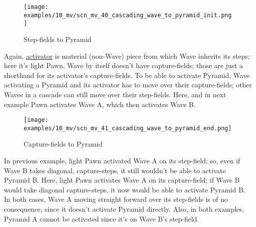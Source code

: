 \vspace*{-0.9\baselineskip}
\noindent
\begin{wrapfigure}[16]{l}{0.4\textwidth}
\centering
\texttt{[image: examples/10\_mv/scn\_mv\_40\_cascading\_wave\_to\_pyramid\_init.png]}
\vspace*{-1.4\baselineskip}
\caption{Step-fields to Pyramid}
\label{fig:scn_mv_40_cascading_wave_to_pyramid_init}
\end{wrapfigure}
Again, \hyperref[sec:Terms/Activator]{activator} is material (non-Wave) piece from
which Wave inherits its steps; here it's light Pawn. Wave by itself doesn't have
capture-fields; those are just a shorthand for its activator's capture-fields.\newline
\indent
To be able to activate Pyramid, Wave activating a Pyramid and its activator has to
move over their capture-fields; other Waves in a cascade can still move over their
step-fields.\newline
\indent
Here, and in next example Pawn activates Wave A, which then activates Wave B.

\vspace*{-0.4\baselineskip}
\noindent
\begin{wrapfigure}[15]{l}{0.4\textwidth}
\centering
\texttt{[image: examples/10\_mv/scn\_mv\_41\_cascading\_wave\_to\_pyramid\_end.png]}
\vspace*{-1.4\baselineskip}
\caption{Capture-fields to Pyramid}
\label{fig:scn_mv_41_cascading_wave_to_pyramid_end}
\end{wrapfigure}
In previous example, light Pawn activated Wave A on its step-field; so, even if Wave
B takes diagonal, capture-steps, it still wouldn't be able to activate Pyramid B.\newline
\indent
Here, light Pawn activates Wave A on its capture-field; if Wave B would take diagonal
capture-steps, it now would be able to activate Pyramid B.\newline
\indent
In both cases, Wave A moving straight forward over its step-fields is of no consequence,
since it doesn't activate Pyramid directly. Also, in both examples, Pyramid A cannot be
activated since it's on Wave B's step-field.

\clearpage %

